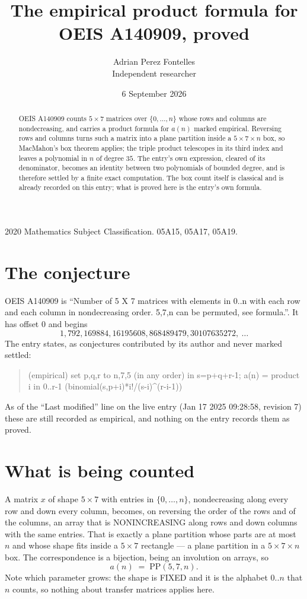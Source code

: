 \documentclass[11pt,a4paper]{article}
\title{The empirical product formula for OEIS A140909, proved}
\author{Adrian Perez Fontelles\\ \small Independent researcher}
\date{6 September 2026}
\theoremstyle{plain}
\theoremstyle{definition}
\begin{document}
\maketitle

\begin{abstract}
OEIS A140909 counts $5\times7$ matrices over $\{0,\dots,n\}$ whose rows and columns are
nondecreasing, and carries a product formula for $a(n)$ marked empirical. Reversing rows and
columns turns such a matrix into a plane partition inside a $5\times7\times n$ box, so
MacMahon's box theorem applies; the triple product telescopes in its third index and leaves a
polynomial in $n$ of degree $35$. The entry's own expression, cleared of its denominator,
becomes an identity between two polynomials of bounded degree, and is therefore settled by a
finite exact computation. The box count itself is classical and is already recorded on this
entry; what is proved here is the entry's own formula.
\end{abstract}

\noindent\small 2020 Mathematics Subject Classification. 05A15, 05A17, 05A19.\normalsize

\section{The conjecture}

OEIS A140909 is ``Number of 5 X 7 matrices with elements in 0..n with each row and each column in nondecreasing order. 5,7,n can be permuted, see formula.''. It has offset $0$ and begins
\[
1, 792, 169884, 16195608, 868489479, 30107635272,\ \dots
\]
The entry states, as conjectures contributed by its author and never marked settled:
\begin{quote}
(empirical) set p,q,r to n,7,5 (in any order) in s=p+q+r-1; a(n) = product {i in 0..r-1} (binomial(s,p+i)*i!/(s-i)\^{}(r-i-1))

\end{quote}
As of the ``Last modified'' line on the live entry (Jan 17 2025 09:28:58, revision 7) these are still
recorded as empirical, and nothing on the entry records them as proved.

\section{What is being counted}

A matrix $x$ of shape $5\times7$ with entries in $\{0,\dots,n\}$, nondecreasing along
every row and down every column, becomes, on reversing the order of the rows and of the
columns, an array that is NONINCREASING along rows and down columns with the same entries. That
is exactly a plane partition whose parts are at most $n$ and whose shape fits inside a
$5\times7$ rectangle --- a plane partition in a $5\times7\times n$ box. The
correspondence is a bijection, being an involution on arrays, so
\[
a(n)\;=\;\mathrm{PP}(5,7,n).
\]
Note which parameter grows: the shape is FIXED and it is the alphabet $0..n$ that $n$ counts,
so nothing about transfer matrices applies here.
\end{document}
